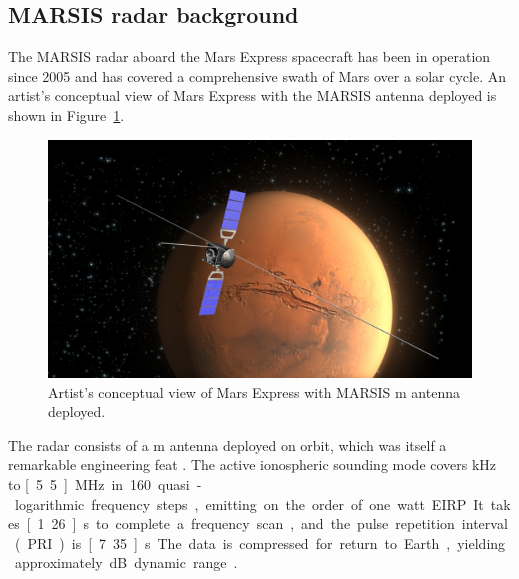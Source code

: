 \FloatBarrier
\subsection{MARSIS radar background}
The MARSIS radar aboard the Mars Express spacecraft has been in operation since 2005 and has covered a comprehensive swath of Mars over a solar cycle.
An artist's conceptual view of Mars Express with the MARSIS antenna deployed is shown in Figure~\ref{fig:mex}.
\begin{figure}\centering
    \includegraphics[width=\linewidth,trim=100 0 50 50,clip]{gfx/marsis_artist_impression}
    \caption{Artist's conceptual view of Mars Express with MARSIS \unit[40]{m} antenna deployed. \citep{mex}}\label{fig:mex}
\end{figure}
The radar consists of a \unit[40]{m} antenna deployed on orbit, which was itself a remarkable engineering feat \citep{adams2006}.
The active ionospheric sounding mode covers \unit[100]{kHz} to \unit[5.5]{MHz} in 160 quasi-logarithmic frequency steps, emitting on the order of one watt EIRP.
It takes \unit[1.26]{s} to complete a frequency scan, and the pulse repetition interval (PRI) is \unit[7.35]{s}.
The data is compressed for return to Earth, yielding approximately \unit[50]{dB} dynamic range \citep{jordan2009}.

